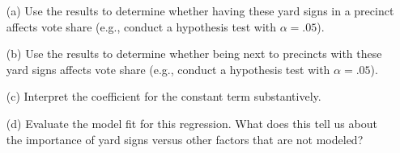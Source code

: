 \documentclass[12pt,letterpaper]{article}
\begin{document}
\vspace{.5cm}
\begin{enumerate}
	\item [(a)] Use the results to determine whether having these yard signs in a precinct affects vote share (e.g., conduct a hypothesis test with $\alpha = .05$).
	
	\newpage		
	\item [(b)]  Use the results to determine whether being
	next to precincts with these yard signs affects vote
	share (e.g., conduct a hypothesis test with $\alpha = .05$).
	
	\vspace{7cm}
	\item [(c)] Interpret the coefficient for the constant term substantively.
	\vspace{7cm}
	
	\item [(d)] Evaluate the model fit for this regression.  What does this	tell us about the importance of yard signs versus other factors that are not modeled?
	
\end{enumerate}  

\newpage
\end{document}
